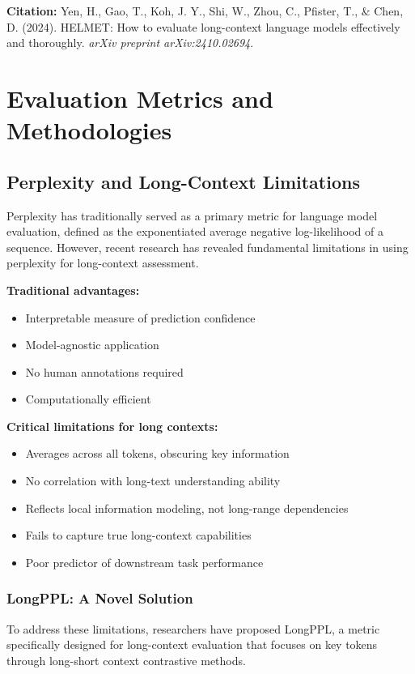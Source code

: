 \documentclass[11pt]{article}
\begin{document}
\textbf{Citation:} Yen, H., Gao, T., Koh, J. Y., Shi, W., Zhou, C., Pfister, T., \& Chen, D. (2024). HELMET: How to evaluate long-context language models effectively and thoroughly. \textit{arXiv preprint arXiv:2410.02694}.

\section{Evaluation Metrics and Methodologies}

\subsection{Perplexity and Long-Context Limitations}

Perplexity has traditionally served as a primary metric for language model evaluation, defined as the exponentiated average negative log-likelihood of a sequence. However, recent research has revealed fundamental limitations in using perplexity for long-context assessment.

\textbf{Traditional advantages:}
\begin{itemize}[leftmargin=*]
    \item Interpretable measure of prediction confidence
    \item Model-agnostic application
    \item No human annotations required
    \item Computationally efficient
\end{itemize}

\textbf{Critical limitations for long contexts:}
\begin{itemize}[leftmargin=*]
    \item Averages across all tokens, obscuring key information
    \item No correlation with long-text understanding ability
    \item Reflects local information modeling, not long-range dependencies
    \item Fails to capture true long-context capabilities
    \item Poor predictor of downstream task performance
\end{itemize}

\subsubsection{LongPPL: A Novel Solution}

To address these limitations, researchers have proposed LongPPL, a metric specifically designed for long-context evaluation that focuses on key tokens through long-short context contrastive methods.
\end{document}
